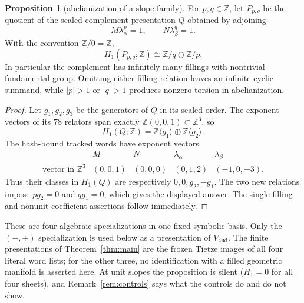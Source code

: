 \documentclass[11pt]{article}
\newcommand{\Z}{\mathbb{Z}}
\theoremstyle{definition}
\newtheorem{proposition}[theorem]{Proposition}
\begin{document}
\begin{proposition}[abelianization of a slope family]
\label{prop:slope-family-h1}
For $p,q\in\Z$, let $P_{p,q}$ be the quotient of the sealed complement
presentation $Q$ obtained by adjoining
\[
             M\lambda_\alpha^p=1,\qquad
             N\lambda_\beta^q=1.
\]
With the convention $\Z/0=\Z$,
\[
             H_1(P_{p,q};\Z)\cong \Z/q\oplus\Z/p.
\]
In particular the complement has infinitely many fillings with nontrivial
fundamental group.  Omitting either filling relation leaves an infinite
cyclic summand, while $|p|>1$ or $|q|>1$ produces nonzero torsion in
abelianization.
\end{proposition}

\begin{proof}
Let $g_1,g_2,g_3$ be the generators of $Q$ in its sealed order.  The exponent
vectors of its $78$ relators span exactly
$\Z(0,0,1)\subset\Z^3$, so
\[
             H_1(Q;\Z)=\Z\langle g_1\rangle\oplus
                        \Z\langle g_2\rangle.
\]
The hash-bound tracked words have exponent vectors
\[
\begin{array}{c|cccc}
 &M&N&\lambda_\alpha&\lambda_\beta\\ \hline
\text{vector in }\Z^3 &(0,0,1)&(0,0,0)&(0,1,2)&(-1,0,-3).
\end{array}
\]
Thus their classes in $H_1(Q)$ are respectively
$0,0,g_2,-g_1$.  The two new relations impose
$pg_2=0$ and $qg_1=0$, which gives the displayed answer.  The single-filling
and nonunit-coefficient assertions follow immediately.
\end{proof}

These are four algebraic specializations in one fixed symbolic basis.  Only
the $(+,+)$ specialization is used below as a presentation of
$V_{\mathrm{aud}}$.  The finite presentations of Theorem~\ref{thm:main} are
the frozen Tietze images of all four literal word lists; for the other three,
no identification with a filled geometric manifold is asserted here.  At
unit slopes the proposition is silent ($H_1=0$ for all four sheets), and
Remark~\ref{rem:controls} says what the controls do and do not show.
\end{document}
